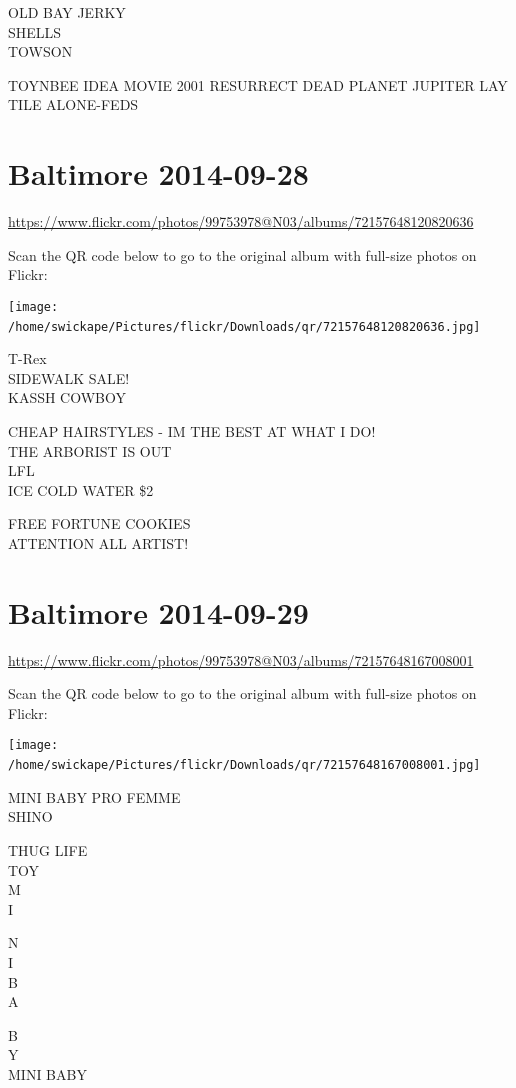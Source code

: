 \documentclass[10pt,letterpaper]{article}
\begin{document}
OLD BAY JERKY\\
SHELLS\\
TOWSON

TOYNBEE IDEA MOVIE 2001 RESURRECT DEAD PLANET JUPITER LAY TILE ALONE{-}FEDS
\

\section*{Baltimore 2014-09-28}

\url{https://www.flickr.com/photos/99753978@N03/albums/72157648120820636}

Scan the QR code below to go to the original album with full-size photos on Flickr:

\texttt{[image: /home/swickape/Pictures/flickr/Downloads/qr/72157648120820636.jpg]}
\

T{-}Rex\\
SIDEWALK SALE!\\
KASSH COWBOY

CHEAP HAIRSTYLES {-} IM THE BEST AT WHAT I DO!\\
THE ARBORIST IS OUT\\
LFL\\
ICE COLD WATER \$2

FREE FORTUNE COOKIES\\
ATTENTION ALL ARTIST!
\

\section*{Baltimore 2014-09-29}

\url{https://www.flickr.com/photos/99753978@N03/albums/72157648167008001}

Scan the QR code below to go to the original album with full-size photos on Flickr:

\texttt{[image: /home/swickape/Pictures/flickr/Downloads/qr/72157648167008001.jpg]}
\

MINI BABY PRO FEMME\\
SHINO

THUG LIFE\\
TOY\\
M\\
I

N\\
I\\
B\\
A

B\\
Y\\
MINI BABY
\
\end{document}
